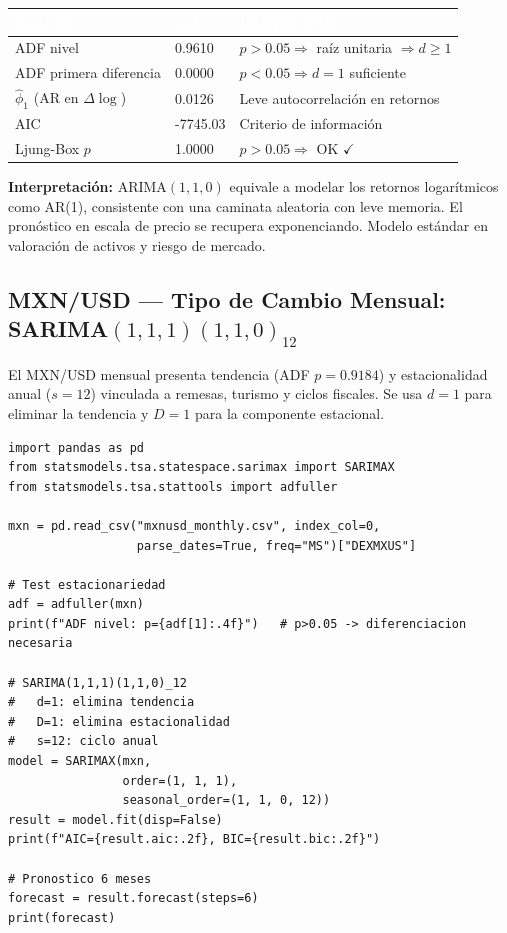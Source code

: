 \documentclass[12pt,letterpaper]{article}
\begin{document}
\begin{center}
\renewcommand{\arraystretch}{1.3}
\begin{tabular}{@{}L{3.4cm}L{3.0cm}L{4.0cm}@{}}
\toprule
{}\textcolor{white}{\textbf{Métrica}} &
\textcolor{white}{\textbf{Valor}} &
\textcolor{white}{\textbf{Interpretación}} \\
\midrule
{} ADF nivel & 0.9610 & $p>0.05 \Rightarrow$ raíz unitaria $\Rightarrow d\geq1$ \\
ADF primera diferencia & 0.0000 & $p<0.05 \Rightarrow d=1$ suficiente \\
 $\hat\phi_1$ (AR en $\Delta\log$) & 0.0126 & Leve autocorrelación en retornos \\
AIC & -7745.03 & Criterio de información \\
 Ljung-Box $p$ & 1.0000 & $p>0.05 \Rightarrow$ OK $\checkmark$ \\
\bottomrule
\end{tabular}
\end{center}

\textbf{Interpretación:} ARIMA$(1,1,0)$ equivale a modelar los retornos logarítmicos como AR(1),
consistente con una caminata aleatoria con leve memoria. El pronóstico en escala de precio
se recupera exponenciando. Modelo estándar en valoración de activos y riesgo de mercado.

\newpage

\subsection{MXN/USD --- Tipo de Cambio Mensual: SARIMA$(1,1,1)(1,1,0)_{12}$}

El MXN/USD mensual presenta tendencia (ADF $p=0.9184$)
y estacionalidad anual ($s=12$) vinculada a remesas, turismo y ciclos fiscales.
Se usa $d=1$ para eliminar la tendencia y $D=1$ para la componente estacional.

\begin{lstlisting}[caption={Ejemplo 3: MXN/USD mensual SARIMA(1,1,1)(1,1,0)12}]
import pandas as pd
from statsmodels.tsa.statespace.sarimax import SARIMAX
from statsmodels.tsa.stattools import adfuller

mxn = pd.read_csv("mxnusd_monthly.csv", index_col=0,
                  parse_dates=True, freq="MS")["DEXMXUS"]

# Test estacionariedad
adf = adfuller(mxn)
print(f"ADF nivel: p={adf[1]:.4f}")   # p>0.05 -> diferenciacion necesaria

# SARIMA(1,1,1)(1,1,0)_12
#   d=1: elimina tendencia
#   D=1: elimina estacionalidad
#   s=12: ciclo anual
model = SARIMAX(mxn,
                order=(1, 1, 1),
                seasonal_order=(1, 1, 0, 12))
result = model.fit(disp=False)
print(f"AIC={result.aic:.2f}, BIC={result.bic:.2f}")

# Pronostico 6 meses
forecast = result.forecast(steps=6)
print(forecast)
\end{lstlisting}
\end{document}
